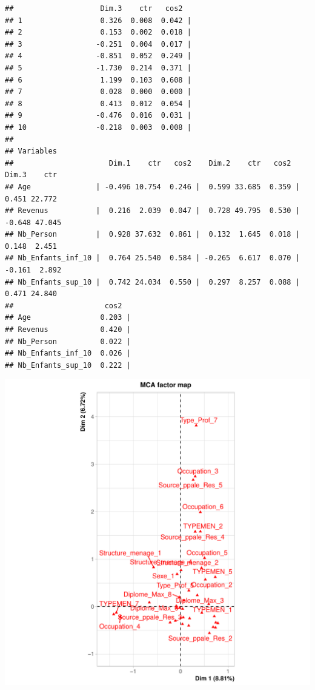 \documentclass[11pt,a4paper, x11names]{article}\usepackage[]{graphicx}\usepackage[]{color}
\makeatletter
\def\maxwidth{ %
  \ifdim\Gin@nat@width>\linewidth
    \linewidth
  \else
    \Gin@nat@width
  \fi
}
\newenvironment{kframe}{%
 \def\at@end@of@kframe{}%
 \ifinner\ifhmode%
  \def\at@end@of@kframe{\end{minipage}}%
  \begin{minipage}{\columnwidth}%
 \fi\fi%
 \def\FrameCommand##1{\hskip\@totalleftmargin \hskip-\fboxsep
 \colorbox{shadecolor}{##1}\hskip-\fboxsep
     \hskip-\linewidth \hskip-\@totalleftmargin \hskip\columnwidth}%
 \MakeFramed {\advance\hsize-\width
   \@totalleftmargin\z@ \linewidth\hsize
   \@setminipage}}%
 {\par\unskip\endMakeFramed%
 \at@end@of@kframe}
\newenvironment{knitrout}{}{} %
\makeatother
\begin{document}
\begin{knitrout}
\begin{kframe}
\begin{verbatim}
##                    Dim.3    ctr   cos2  
## 1                  0.326  0.008  0.042 |
## 2                  0.153  0.002  0.018 |
## 3                 -0.251  0.004  0.017 |
## 4                 -0.851  0.052  0.249 |
## 5                 -1.730  0.214  0.371 |
## 6                  1.199  0.103  0.608 |
## 7                  0.028  0.000  0.000 |
## 8                  0.413  0.012  0.054 |
## 9                 -0.476  0.016  0.031 |
## 10                -0.218  0.003  0.008 |
## 
## Variables
##                      Dim.1    ctr   cos2    Dim.2    ctr   cos2    Dim.3    ctr
## Age               | -0.496 10.754  0.246 |  0.599 33.685  0.359 |  0.451 22.772
## Revenus           |  0.216  2.039  0.047 |  0.728 49.795  0.530 | -0.648 47.045
## Nb_Person         |  0.928 37.632  0.861 |  0.132  1.645  0.018 |  0.148  2.451
## Nb_Enfants_inf_10 |  0.764 25.540  0.584 | -0.265  6.617  0.070 | -0.161  2.892
## Nb_Enfants_sup_10 |  0.742 24.034  0.550 |  0.297  8.257  0.088 |  0.471 24.840
##                     cos2  
## Age                0.203 |
## Revenus            0.420 |
## Nb_Person          0.022 |
## Nb_Enfants_inf_10  0.026 |
## Nb_Enfants_sup_10  0.222 |
\end{verbatim}
\end{kframe}
\includegraphics[width=\maxwidth]{figure/Analyse_factorielle-3} 


\end{knitrout}
\end{document}
